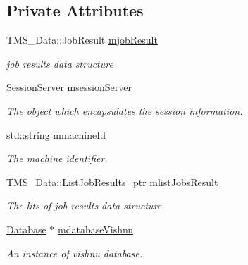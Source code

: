 \subsection*{Private Attributes}
\begin{DoxyCompactItemize}
\item 
\hypertarget{classJobOutputServer_a57b5a88791b2dec58d747d59f5dd7866}{
TMS\_\-Data::JobResult \hyperlink{classJobOutputServer_a57b5a88791b2dec58d747d59f5dd7866}{mjobResult}}
\label{classJobOutputServer_a57b5a88791b2dec58d747d59f5dd7866}

\begin{DoxyCompactList}\small\item\em job results data structure \item\end{DoxyCompactList}\item 
\hypertarget{classJobOutputServer_a1267984244f5f2877924c8223caea895}{
\hyperlink{classSessionServer}{SessionServer} \hyperlink{classJobOutputServer_a1267984244f5f2877924c8223caea895}{msessionServer}}
\label{classJobOutputServer_a1267984244f5f2877924c8223caea895}

\begin{DoxyCompactList}\small\item\em The object which encapsulates the session information. \item\end{DoxyCompactList}\item 
\hypertarget{classJobOutputServer_a8cd05c2f0fa890d2373c557b96925e30}{
std::string \hyperlink{classJobOutputServer_a8cd05c2f0fa890d2373c557b96925e30}{mmachineId}}
\label{classJobOutputServer_a8cd05c2f0fa890d2373c557b96925e30}

\begin{DoxyCompactList}\small\item\em The machine identifier. \item\end{DoxyCompactList}\item 
\hypertarget{classJobOutputServer_a30eaf288d2f24e1f94a106f249c0c43f}{
TMS\_\-Data::ListJobResults\_\-ptr \hyperlink{classJobOutputServer_a30eaf288d2f24e1f94a106f249c0c43f}{mlistJobsResult}}
\label{classJobOutputServer_a30eaf288d2f24e1f94a106f249c0c43f}

\begin{DoxyCompactList}\small\item\em The lits of job results data structure. \item\end{DoxyCompactList}\item 
\hypertarget{classJobOutputServer_a24ca587db04f84fb89bcc07399bf8f96}{
\hyperlink{classDatabase}{Database} $\ast$ \hyperlink{classJobOutputServer_a24ca587db04f84fb89bcc07399bf8f96}{mdatabaseVishnu}}
\label{classJobOutputServer_a24ca587db04f84fb89bcc07399bf8f96}

\begin{DoxyCompactList}\small\item\em An instance of vishnu database. \item\end{DoxyCompactList}\end{DoxyCompactItemize}


